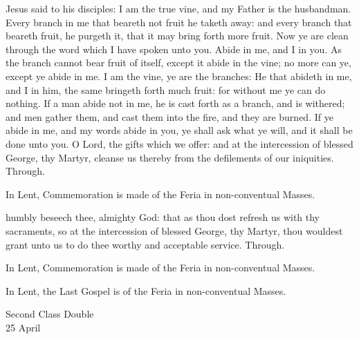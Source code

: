  Jesus said to his disciples: I am the true vine, and my Father is the husbandman. Every branch in me that beareth not fruit he taketh away: and every branch that beareth fruit, he purgeth it, that it may bring forth more fruit. Now ye are clean through the word which I have spoken unto you. Abide in me, and I in you. As the branch cannot bear fruit of itself, except it abide in the vine; no more can ye, except ye abide in me. I am the vine, ye are the branches: He that abideth in me, and I in him, the same bringeth forth much fruit: for without me ye can do nothing. If a man abide not in me, he is cast forth as a branch, and is withered; and men gather them, and cast them into the fire, and they are burned. If ye abide in me, and my words abide in you, ye shall ask what ye will, and it shall be done unto you.
\secret
{} O Lord, the gifts which we offer: and at the intercession of blessed George, thy Martyr, cleanse us thereby from the defilements of our iniquities. Through.
\begin{rubric}
    In Lent, Commemoration is made of the Feria in non-conventual Masses.
\end{rubric}
\postcommunion
{} humbly beseech thee, almighty God: that as thou dost refresh us with thy sacraments, so at the intercession of blessed George, thy Martyr, thou wouldest grant unto us to do thee worthy and acceptable service. Through.
\begin{rubric}
    In Lent, Commemoration is made of the Feria in non-conventual Masses.
\end{rubric}
\begin{rubric}
    In Lent, the Last Gospel is of the Feria in non-conventual Masses.
\end{rubric}

\begin{inhead}
    {Second Class Double\\
25 April}
\end{inhead}
\collect

